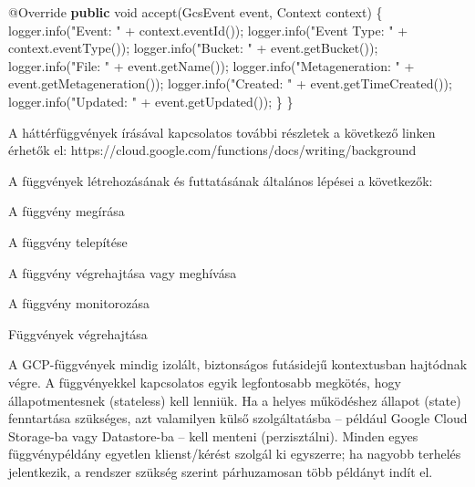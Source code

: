 \documentclass[
]{article}
\newenvironment{Shaded}{}{}
\newcommand{\AttributeTok}[1]{\textcolor[rgb]{0.49,0.56,0.16}{#1}}
\newcommand{\BuiltInTok}[1]{\textcolor[rgb]{0.00,0.50,0.00}{#1}}
\newcommand{\DataTypeTok}[1]{\textcolor[rgb]{0.56,0.13,0.00}{#1}}
\newcommand{\FunctionTok}[1]{\textcolor[rgb]{0.02,0.16,0.49}{#1}}
\newcommand{\KeywordTok}[1]{\textcolor[rgb]{0.00,0.44,0.13}{\textbf{#1}}}
\newcommand{\NormalTok}[1]{#1}
\newcommand{\OperatorTok}[1]{\textcolor[rgb]{0.40,0.40,0.40}{#1}}
\newcommand{\StringTok}[1]{\textcolor[rgb]{0.25,0.44,0.63}{#1}}
\begin{document}
\begin{Shaded}
\begin{Highlighting}[]
  \AttributeTok{@Override}
  \KeywordTok{public} \DataTypeTok{void} \FunctionTok{accept}\OperatorTok{(}\NormalTok{GcsEvent event}\OperatorTok{,} \BuiltInTok{Context}\NormalTok{ context}\OperatorTok{)} \OperatorTok{\{}
\NormalTok{    logger}\OperatorTok{.}\FunctionTok{info}\OperatorTok{(}\StringTok{"Event: "} \OperatorTok{+}\NormalTok{ context}\OperatorTok{.}\FunctionTok{eventId}\OperatorTok{());}
\NormalTok{    logger}\OperatorTok{.}\FunctionTok{info}\OperatorTok{(}\StringTok{"Event Type: "} \OperatorTok{+}\NormalTok{ context}\OperatorTok{.}\FunctionTok{eventType}\OperatorTok{());}
\NormalTok{    logger}\OperatorTok{.}\FunctionTok{info}\OperatorTok{(}\StringTok{"Bucket: "} \OperatorTok{+}\NormalTok{ event}\OperatorTok{.}\FunctionTok{getBucket}\OperatorTok{());}
\NormalTok{    logger}\OperatorTok{.}\FunctionTok{info}\OperatorTok{(}\StringTok{"File: "} \OperatorTok{+}\NormalTok{ event}\OperatorTok{.}\FunctionTok{getName}\OperatorTok{());}
\NormalTok{    logger}\OperatorTok{.}\FunctionTok{info}\OperatorTok{(}\StringTok{"Metageneration: "} \OperatorTok{+}\NormalTok{ event}\OperatorTok{.}\FunctionTok{getMetageneration}\OperatorTok{());}
\NormalTok{    logger}\OperatorTok{.}\FunctionTok{info}\OperatorTok{(}\StringTok{"Created: "} \OperatorTok{+}\NormalTok{ event}\OperatorTok{.}\FunctionTok{getTimeCreated}\OperatorTok{());}
\NormalTok{    logger}\OperatorTok{.}\FunctionTok{info}\OperatorTok{(}\StringTok{"Updated: "} \OperatorTok{+}\NormalTok{ event}\OperatorTok{.}\FunctionTok{getUpdated}\OperatorTok{());}
  \OperatorTok{\}}
\OperatorTok{\}}
\end{Highlighting}
\end{Shaded}

A háttérfüggvények írásával kapcsolatos további részletek a következő
linken érhetők el:
https://cloud.google.com/functions/docs/writing/background

A függvények létrehozásának és futtatásának általános lépései a
következők:

A függvény megírása

A függvény telepítése

A függvény végrehajtása vagy meghívása

A függvény monitorozása

Függvények végrehajtása

A GCP-függvények mindig izolált, biztonságos futásidejű kontextusban
hajtódnak végre. A függvényekkel kapcsolatos egyik legfontosabb
megkötés, hogy állapotmentesnek (stateless) kell lenniük. Ha a helyes
működéshez állapot (state) fenntartása szükséges, azt valamilyen külső
szolgáltatásba -- például Google Cloud Storage-ba vagy Datastore-ba --
kell menteni (perzisztálni). Minden egyes függvénypéldány egyetlen
klienst/kérést szolgál ki egyszerre; ha nagyobb terhelés jelentkezik, a
rendszer szükség szerint párhuzamosan több példányt indít el.
\end{document}
